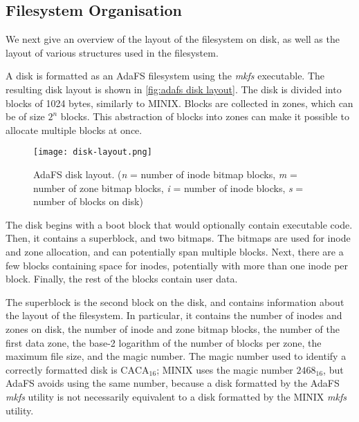 \subsection{Filesystem Organisation}
We next give an overview of the layout of the filesystem on disk, as well as the layout of various structures used in the filesystem.

A disk is formatted as an AdaFS filesystem using the \textit{mkfs} executable.
The resulting disk layout is shown in \autoref{fig:adafs disk layout}.
The disk is divided into blocks of 1024 bytes, similarly to MINIX.
Blocks are collected in zones, which can be of size $2^n$ blocks.
This abstraction of blocks into zones can make it possible to allocate multiple blocks at once.

\begin{figure}[tb]
  \centering
  \texttt{[image: disk-layout.png]}
  \caption{AdaFS disk layout. (\textit{n} = number of inode bitmap blocks, \textit{m} = number of zone bitmap blocks, \textit{i} = number of inode blocks, \textit{s} = number of blocks on disk)}
  \label{fig:adafs disk layout}
\end{figure}


The disk begins with a boot block that would optionally contain executable code.
Then, it contains a superblock, and two bitmaps.
The bitmaps are used for inode and zone allocation, and can potentially span multiple blocks.
Next, there are a few blocks containing space for inodes, potentially with more than one inode per block.
Finally, the rest of the blocks contain user data.

The superblock is the second block on the disk, and contains information about the layout of the filesystem.
In particular, it contains the number of inodes and zones on disk, the number of inode and zone bitmap blocks, the number of the first data zone, the base-2 logarithm of the number of blocks per zone, the maximum file size, and the magic number.
The magic number used to identify a correctly formatted disk is $\text{CACA}_{16}$; MINIX uses the magic number $2468_{16}$, but AdaFS avoids using the same number, because a disk formatted by the AdaFS \textit{mkfs} utility is not necessarily equivalent to a disk formatted by the MINIX \textit{mkfs} utility.

